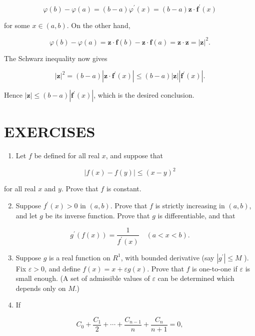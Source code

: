 \documentclass[10pt]{article}
\begin{document}
$$
\varphi(b)-\varphi(a)=(b-a) \varphi^{\prime}(x)=(b-a) \mathbf{z} \cdot \mathbf{f}^{\prime}(x)
$$

for some $x \in(a, b)$. On the other hand,

$$
\varphi(b)-\varphi(a)=\mathbf{z} \cdot \mathbf{f}(b)-\mathbf{z} \cdot \mathbf{f}(a)=\mathbf{z} \cdot \mathbf{z}=|\mathbf{z}|^{2} .
$$

The Schwarz inequality now gives

$$
|\mathbf{z}|^{2}=(b-a)\left|\mathbf{z} \cdot \mathbf{f}^{\prime}(x)\right| \leq(b-a)|\mathbf{z}|\left|\mathbf{f}^{\prime}(x)\right| .
$$

Hence $|\mathbf{z}| \leq(b-a)\left|\mathbf{f}^{\prime}(x)\right|$, which is the desired conclusion.

\section{EXERCISES}
\begin{enumerate}
  \item Let $f$ be defined for all real $x$, and suppose that
\end{enumerate}

$$
|f(x)-f(y)| \leq(x-y)^{2}
$$

for all real $x$ and $y$. Prove that $f$ is constant.

\begin{enumerate}
  \setcounter{enumi}{1}
  \item Suppose $f^{\prime}(x)>0$ in $(a, b)$. Prove that $f$ is strictly increasing in $(a, b)$, and let $g$ be its inverse function. Prove that $g$ is differentiable, and that
\end{enumerate}

$$
g^{\prime}(f(x))=\frac{1}{f^{\prime}(x)} \quad(a<x<b) .
$$

\begin{enumerate}
  \setcounter{enumi}{2}
  \item Suppose $g$ is a real function on $R^{1}$, with bounded derivative (say $\left|g^{\prime}\right| \leq M$ ). Fix $\varepsilon>0$, and define $f(x)=x+\varepsilon g(x)$. Prove that $f$ is one-to-one if $\varepsilon$ is small enough. (A set of admissible values of $\varepsilon$ can be determined which depends only on $M$.)

  \item If

\end{enumerate}

$$
C_{0}+\frac{C_{1}}{2}+\cdots+\frac{C_{n-1}}{n}+\frac{C_{n}}{n+1}=0,
$$
\end{document}
